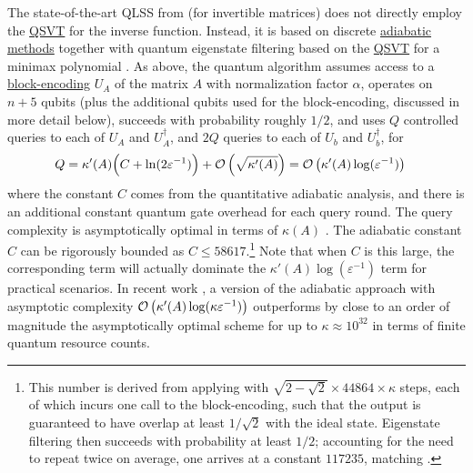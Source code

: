 \begin{refsection}
The state-of-the-art QLSS from \cite{costa2021OptimalLinearSystem} (for invertible matrices) does not directly employ the \hyperref[prim:QSVT]{QSVT} for the inverse function. Instead, it is based on discrete \hyperref[prim:QuantumAdiabaticAlgorithm]{adiabatic methods} together with quantum eigenstate filtering based on the \hyperref[prim:QSVT]{QSVT} for a minimax polynomial \cite{lin2019OptimalQEigenstateFiltering}. As above, the quantum algorithm assumes access to a \hyperref[prim:BlockEncodings]{block-encoding} $U_A$ of the matrix $A$ with normalization factor $\alpha$, operates on $n+5$ qubits (plus the additional qubits used for the block-encoding, discussed in more detail below), succeeds with probability roughly $1/2$, and uses $Q$ controlled queries to each of $U_A$ and $U_A^\dagger$, and $2Q$ queries to each of $U_b$ and $U_b^\dagger$, for 
\begin{align}\label{eq:kappa-scaling}
Q &= \kappa'(A)\Big(C + \ln(2\varepsilon^{-1})\Big) + \bigO{\sqrt{\kappa'(A)}}%
=\bigO{\kappa'(A)\log(\varepsilon^{-1})}
\end{align}
where the constant $C$ comes from the quantitative adiabatic analysis, and there is an additional constant quantum gate overhead for each query round. 
The query complexity is asymptotically optimal in terms of $\kappa(A)$ \cite{harrow2009QLinSysSolver}. The adiabatic constant $C$ can be rigorously bounded as $C \leq \num{58617}$.\footnote{This number is derived from applying \cite[Theorem 9]{costa2021OptimalLinearSystem} with $\sqrt{2-\sqrt{2}}\times \num{44864} \times \kappa$ steps, each of which incurs one call to the block-encoding, such that the output is guaranteed to have overlap at least $1/\sqrt{2}$ with the ideal state. Eigenstate filtering then succeeds with probability at least $1/2$; accounting for the need to repeat twice on average, one arrives at a constant $\num{117235}$, matching \cite[Eq.~(L2)]{jennings2023QLSS}.} Note that when $C$ is this large, the corresponding term will actually dominate the $\kappa'(A)\log(\varepsilon^{-1})$ term for practical scenarios. In recent work \cite{jennings2023QLSS}, a version of the adiabatic approach with asymptotic complexity $\mathcal{O}\left( \kappa'(A)\log(\kappa\varepsilon^{-1}) \right)$ outperforms by close to an order of magnitude the asymptotically optimal scheme for up to $\kappa\approx10^{32}$ in terms of finite quantum resource counts.


\end{refsection}
